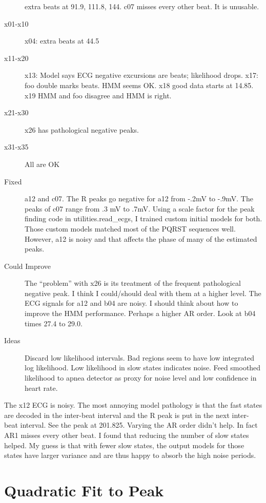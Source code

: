 \documentclass[12pt]{article}
\begin{document}
\begin{description}
  extra beats at 91.9, 111.8, 144.  c07 misses every other beat.  It
  is unusable.
\item[x01-x10] x04: extra beats at 44.5
\item[x11-x20] x13: Model says ECG negative excursions are beats;
  likelihood drops.  x17: foo double marks beats.  HMM seems OK.  x18
  good data starts at 14.85.  x19 HMM and foo disagree and HMM is
  right.
\item[x21-x30] x26 has pathological negative peaks.
\item[x31-x35] All are OK
\item[Fixed] a12 and c07.  The R peaks go negative for a12 from -.2mV
  to -.9mV.  The peaks of c07 range from .3 mV to .7mV.  Using a scale
  factor for the peak finding code in utilities.read\_ecgs, I trained
  custom initial models for both.  Those custom models matched most of
  the PQRST sequences well.  However, a12 is noisy and that affects
  the phase of many of the estimated peaks.
\item[Could Improve] The ``problem'' with x26 is its treatment of the
  frequent pathological negative peak.  I think I could/should deal
  with them at a higher level.  The ECG signals for a12 and b04 are
  noisy.  I should think about how to improve the HMM performance.
  Perhaps a higher AR order.  Look at b04 times 27.4 to 29.0.
\item[Ideas] Discard low likelihood intervals.  Bad regions seem to have low
integrated log likelihood.  Low likelihood in slow states indicates
noise.  Feed smoothed likelihood to apnea detector as proxy for noise
level and low confidence in heart rate.
\end{description}

The x12 ECG is noisy.  The most annoying model pathology is that the
fast states are decoded in the inter-beat interval and the R peak is
put in the next inter-beat interval.  See the peak at 201.825.
Varying the AR order didn't help.  In fact AR1 misses every other
beat.  I found that reducing the number of slow states helped.  My
guess is that with fewer slow states, the output models for those
states have larger variance and are thus happy to absorb the high
noise periods.

\section{Quadratic Fit to Peak}
\label{sec:quadratic}
\end{document}
